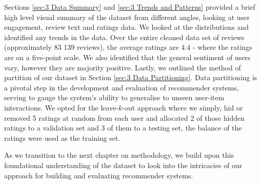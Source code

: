 Sections \ref{sec:3 Data Summary} and \ref{sec:3 Trends and Patterns} provided a brief high level visual summary of the dataset from different angles, looking at user engagement, review text and ratings data. We looked at the distributions and identified any trends in the data. Over the entire cleaned data set of reviews (approximately 83 139 reviews), the average ratings are 4.4 - where the ratings are on a five-point scale. We also identified that the general sentiment of users vary, however they are majority positive. Lastly, we outlined the method of partition of our dataset in Section \ref{sec:3 Data Partitioning}. Data partitioning is a pivotal step in the development and evaluation of recommender systems, serving to gauge the system's ability to generalise to unseen user-item interactions. We opted for the leave-$k$-out approach where we simply, hid or removed 5 ratings at random from each user and allocated 2 of those hidden ratings to a validation set and 3 of them to a testing set, the balance of the ratings were used as the training set. 

As we transition to the next chapter on methodology, we build upon this foundational understanding of the dataset to look into the intricacies of our approach for building and evaluating recommender systems.
